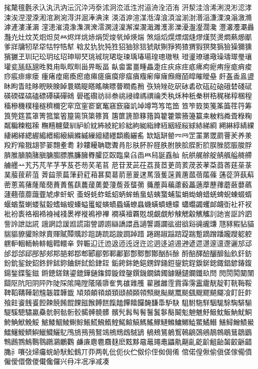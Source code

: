 毮氂氊氎氶𣱿汍汛汭沄沉㳃沔沗沭泂㳒泜泩泭𣴀洀洤洦洧
汧洯洼浛浠浰涀涁涊涍涑涘𣵀𣷺𣷹𣷓涫涮涴淂洴淈淎淟淶
渶渞㴑渲湈湉湋湌湏湓湔湗湣㴞溓溧溴滃漵滫滹滻漊漌漘
漥漶漼𣽾潒潗潠潨澐澖澾澟澥澯㵤濈濉濩𤂖濼瀀瀊瀣𤄃瀺
灃灇灋㶚灥灩灮灶炆炗𤇆炟炱𤇾烬烊烑焃焆焈焌㷀焯煐煓
煞㷔熖熀熛熠熢熮熯𤎼燙燜爇㸅爴爹牂牗牣𤘩牮牯牸牿犎
𤚥犮犰狁㹠狌㹦㹨狳狺猇猒猘猙㺃猹猬猳猽獒㺔獫𤢖獮獯
獱玁玊玔玘玜玥玹玿珅珋珡珧珹琓珺琁瑓瑀瑃瑒瑝璁璈𤩍
璒璗璙璡璥璪璹璻璺瓖瓘瓫𤭖瓺𤭯甠甤甪㽗𤰖甽甾畀畈畐
畒畲畱畺畽畾疌㽵疢㽷疰疷疿痀痆痏痓痝痟痠痧痮痱瘃瘘
瘇瘏㾮𤸎瘓瘛瘜𤸷瘥瘨瘼瘳𤹪㿉癁𤺋癉癕㿗癮皕皡皠皧皨
皯𥁊盉𥁕盨𥄢眗眚眭眵𥆩䀹𥇥𥇍睘𥈞睼𥉌䁘瞚瞟瞢瞤矞矟
矤矪矬矻𥐮砅砉砍砙砬硇硪𥓙碊碔碤碝碟碻磕磦磹磺磾𥖧
礐礛礥祊祘䄅祧祲禕禡禩禴秂秇秌种秖䅈𥞩𥞴䅏稊稕稛䅣
稸穇穖穙穜穟穧穪穵窂窊窐窬𥧔䆴窹窾䆿竌竨竴𥫤𥫣𥫱笽
笪笮笯䇦䇳筿筁䇮筕筹筤筦筳𥮲䈇箐箛䈎箵箼篅篊𥱋𥱤篔
篖篚篪篰簃簎籅籊籗籞籡籩籯𥸮𥹖𥹥粦𥹢粶粷𥻘糄𥻂糍𥻨
𥼣糦𥽜糵紃䋆紒紞𥿠𥿔紽紾絀絇𦀌𥿻䋖絚絪絰䋝絿𦀗綈綗
𦁠綝綧綪綶緀緗緙緦䌂𦃭縉縐縗縝縧縬繅繵繾纆纇䌫纚䍃
缼缻缾罃㓁𦉰𦊆罣罤罭罽罾羐养𣴎羖羜羭𦐂翃翏翣翲耊耈
耖耬耰聃聦聻肙肜肤肧肸𦙾胅胕胦脍胵胻䏮脵脞䏰脤脧脬
𦜝脽䐈腩䐗䐜膅䐢膘膲臁臃臖臛𦣝臤𦣪臬臽臿𦥯舄𦧝舙舢
𦨞舼艉艅𦩘䑶䑺艗𦪌艜艣𦪷䒑艽艿芃芊芓芧芨芲芴芺芼苢
苨苷茇茈茌荔茛茝茰茼荄荗䒾䓔䒳莔莕莛莝菉菐菔菝菥菹
萕𦱳萗萹葏葑葒葙葚葜𦳝葥葸葼蒁䔍蒗蒦蒾䔈蓎蓏蓓𦹥蓧
蓪蓯蓱蓺蔛蔤蔥蔫蕏蕯䕃蕑蕡蕢𦾔蕻蕽蕿薁薆薓薝薟𦿸𦿶
𦿷薼藇藊藘藙藟藡藦藶蘀蘑蘞蘡蘤蘧𧄍蘹蘼𧄹虀虓虖虷蚇
蚉蚜蚝蚱蚳蛁蛃蛑蛕蛗蛣蛦䖸蜅蜇蜎蜐蜟蜡蜣蜱蜺蝀蝃蝑
蝘蝤蝥蝲蝼𧏛𧏚螧螉螋螓螠𧏾䗥螾𧐐蟁蟎蟟𧑉蟣蟥蟦蟪蠓
蠨蠮蠲蠼䘏衊衘𧘕𧘔衩𧘱衯袠袼裀𧚓裑裓䙁褁𧜎褷𧜣襂襅
襉𧝒襢覉覐覟覰覷觘觫䚡觳觽觿䚯訑訔𧦅訡訵訾詅詍詘誮
誐誷諗諼𧪄謊謅謍謜謭䜌譑譞譶讁讋讔讕谹𧮳谽𧮾𧯇豅豏
豗豩豭𧲸貓貒貙䝤貛賖賕𧶠賱𧸐贉贎跈跙踌䟽跽踆𨂊踔踖
踡踢踧𨂻䠖踶踹蹔蹢蹭蹯躘躞躵躻𨊂䡎𨋳輀輈輫轀轊轘𨐌
辤辴𨑕迁迆﨤迊迍迓迕迱迵迻逌逷𨕫遃遝𨗈𨗉邅邌邐邡䢵
邰邶郃郈𨛗郜郟𨛺郶郲鄀郫郾郿鄄鄆鄘鄞鄷鄹酆酇酗酙酴
酹醅醳醶釃釄𨥉𨥆釬鈁鈖鈗𨥫鉂鉊鉖鉡鉥鉨𨦈鉼鉽鉿銉銍
銗銙銟銫𨦺𨦻銲銿鋀鋆鋎鋥錑𨨞𨨩鋷錩𨩱𨩃鍑鍚鍫鍱鍳鎡
𨪙𨫍鎈鎋鎏鎞鏵𨫤𨫝鏱鏇鏜鏧鐉鐖鐗鏻鐲鐻𨯁𨯯鑭鑯镹閆
閌閍𨴐𨵱闈𨷻𨸟阬阳阴𨸶阼陡𨺉隂𨻫隚𨼲䧧隳隺隽䧺𨿸雘
雚雝䨄霔霣䨩霶靁靇靗靛靪𩊠𩊱鞖鞞鞱鞲鞾韌韑韔韘韡韱
頄頍頔頖䪼𩒐頲頳頥顇顦颫颭颰𩗏颷颻颼飂飇飋飡飣飪飰
飱飳餈䬻𩛰餖餗𩜙餚餛餜𩝐餱餺餻餼饁饆饎饠馣馦馽馿駃
駔駙駞𩣆駰駹駼騊騑騚騠騱驄驌驘䯂骯䯊骷䯒骹𩩲髆髐髒
髕髠髥髩鬌鬐鬒鬖鬜鬫鬽䰠魋魣魥魫魬魶魷鮦鮬𩷛鮲鮸鮾
鯳鯘鯝鯪鯯鯮𩸕𩺊𩹉鰖鰘鰙鰚鰝鰢鰩𩻄鰱鰷鱅鱜𩻩鱉鱊𩻛
鱔鱘鱛鱝鱟鱩鱪鱫鱭鱮鱲鱵鱺鳦鳲鴋𩿎𩿗鴑鴗鴘𪀯䳄𪀚鴲
䳑鵊鵟鵢𪃹𪂂鵳鵶鵷鶄鶙鶡鶿鶵鶹鶽鷉鷚鷠鷣䴇鸊鸂鸍鸜
鹻𢈘麀麅麛𪎌麽𪐷黟黿鼂䵷鼃鼺鼽齆齓齕齘𪗱齝𪘂齩齭齰
𪚲⺬㘔㢭㷌㿜䖾䘐䭾䰸䳡丌丣两乹仳伌伙伫伮伱侄侞侷倄
倌偌偟偢偷傎傞傢僃僨僱僾儇儌儍儎儳儸兴冄冸冺凈减凑
